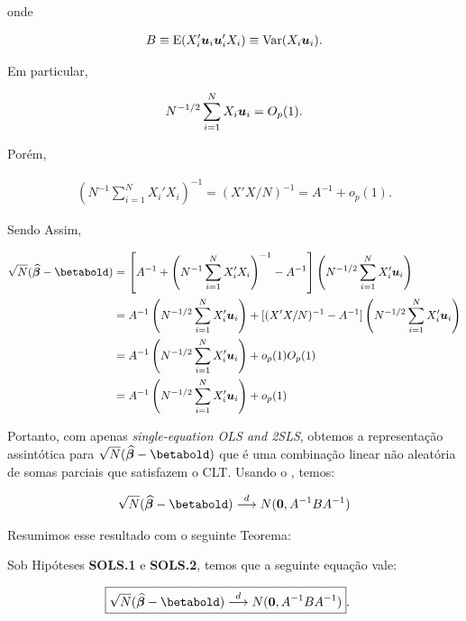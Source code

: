 \documentclass[11pt, oneside, a4paper, article]{article}
\numberwithin{equation}{section}
\begin{document}
\noindent
onde

\vspace{-1 em}
\begin{align*} 
B \equiv \text{E}(X_{i}' \boldsymbol{u}_{i} \boldsymbol{u}_{i}' X_{i}) \equiv \text{Var}(X_{i} \boldsymbol{u}_{i}).
\end{align*}

\noindent
Em particular,

\vspace{-1 em}
\begin{align*} 
N^{-1/2} \sum_{i=1}^{N} X_{i} \boldsymbol{u}_{i} = O_{p}(1).
\end{align*}

Porém,

\vspace{-1 em}
\begin{align*} 
	\left( N^{-1} \sum_{i=1}^{N} X_{i}' X_{i} \right)^{-1} = (X'X/N)^{-1} = A^{-1} + o_{p}(1).
\end{align*}

\noindent
Sendo Assim,

\vspace{-1 em}
\begin{align*} 
\sqrt{N}(\betahatbold - \betabold) &= 
\left[ 
A^{-1} +
\left( N^{-1} \sum_{i=1}^{N} X_{i}' X_{i}   \right)^{-1}
- A^{-1}
\right]
\left( N^{-1/2} \sum_{i=1}^{N} X_{i}' \mbs{u}_{i}   \right)
\\ &=
A^{-1}\left( N^{-1/2} \sum_{i=1}^{N} X_{i}' \mbs{u}_{i}   \right)
+
[(X'X/N)^{-1} - A^{-1}]
\left( N^{-1/2} \sum_{i=1}^{N} X_{i}' \mbs{u}_{i}   \right)
\\&=
A^{-1}\left( N^{-1/2} \sum_{i=1}^{N} X_{i}' \mbs{u}_{i}   \right)
+ o_{p}(1) O_{p}(1)
\\&=
A^{-1}\left( N^{-1/2} \sum_{i=1}^{N} X_{i}' \mbs{u}_{i}   \right)
+ o_{p}(1)
\end{align*}

Portanto, com apenas \textit{single-equation OLS and 2SLS}, obtemos a representação assintótica para $\sqrt{N}(\betahatbold - \betabold)$ que é uma combinação linear não aleatória de somas parciais que satisfazem o CLT.
Usando o , temos:

\begin{align*} 
\sqrt{N}(\betahatbold - \betabold)
\arrowd
N(\mbs{0}, A^{-1} B A^{-1})
\end{align*}

Resumimos esse resultado com o seguinte Teorema:

\begin{teo1}\label{teo:sols:norm}
Sob Hipóteses \textbf{SOLS.1} e \textbf{SOLS.2}, temos que a seguinte equação vale:

\begin{align} \label{eq:sols:norm}
	\Aboxed{
\sqrt{N}(\betahatbold - \betabold)
\arrowd
N(\mbs{0}, A^{-1} B A^{-1})
}.
\end{align}
\end{teo1}
\end{document}
